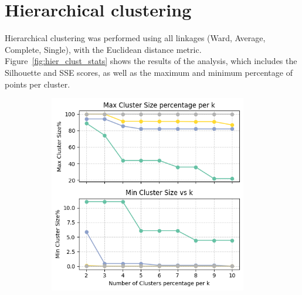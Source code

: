 \section{Hierarchical clustering}\label{sec:hierarchical}
Hierarchical clustering was performed using all linkages (Ward, Average, Complete, Single), with the Euclidean distance metric.
Figure~\ref{fig:hier_clust_stats} shows the results of the analysis, which includes the Silhouette and SSE scores, as well as the maximum and minimum percentage of points per cluster.
\begin{figure}[H]
    \centering
    \begin{subfigure}[t]{0.49\textwidth}
        \centering
        \includegraphics[width=0.95\textwidth]{plots/max_min_pctg.png}
        \label{fig:max_min_pctg}
    \end{subfigure}
    \hfill
    \begin{subfigure}[t]{0.49\textwidth}
        \centering

\end{subfigure}
\end{figure}

